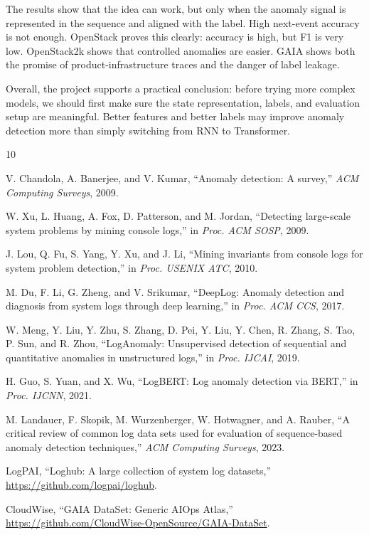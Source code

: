 \documentclass[11pt]{article}
\begin{document}
The results show that the idea can work, but only when the anomaly signal is represented in the sequence and aligned with the label. High next-event accuracy is not enough. OpenStack proves this clearly: accuracy is high, but F1 is very low. OpenStack2k shows that controlled anomalies are easier. GAIA shows both the promise of product-infrastructure traces and the danger of label leakage.

Overall, the project supports a practical conclusion: before trying more complex models, we should first make sure the state representation, labels, and evaluation setup are meaningful. Better features and better labels may improve anomaly detection more than simply switching from RNN to Transformer.

\begin{thebibliography}{10}

V. Chandola, A. Banerjee, and V. Kumar,
``Anomaly detection: A survey,''
\emph{ACM Computing Surveys}, 2009.

W. Xu, L. Huang, A. Fox, D. Patterson, and M. Jordan,
``Detecting large-scale system problems by mining console logs,''
in \emph{Proc. ACM SOSP}, 2009.

J. Lou, Q. Fu, S. Yang, Y. Xu, and J. Li,
``Mining invariants from console logs for system problem detection,''
in \emph{Proc. USENIX ATC}, 2010.

M. Du, F. Li, G. Zheng, and V. Srikumar,
``DeepLog: Anomaly detection and diagnosis from system logs through deep learning,''
in \emph{Proc. ACM CCS}, 2017.

W. Meng, Y. Liu, Y. Zhu, S. Zhang, D. Pei, Y. Liu, Y. Chen, R. Zhang, S. Tao, P. Sun, and R. Zhou,
``LogAnomaly: Unsupervised detection of sequential and quantitative anomalies in unstructured logs,''
in \emph{Proc. IJCAI}, 2019.

H. Guo, S. Yuan, and X. Wu,
``LogBERT: Log anomaly detection via BERT,''
in \emph{Proc. IJCNN}, 2021.

M. Landauer, F. Skopik, M. Wurzenberger, W. Hotwagner, and A. Rauber,
``A critical review of common log data sets used for evaluation of sequence-based anomaly detection techniques,''
\emph{ACM Computing Surveys}, 2023.

LogPAI,
``Loghub: A large collection of system log datasets,''
\url{https://github.com/logpai/loghub}.

CloudWise,
``GAIA DataSet: Generic AIOps Atlas,''
\url{https://github.com/CloudWise-OpenSource/GAIA-DataSet}.

\end{thebibliography}
\end{document}
